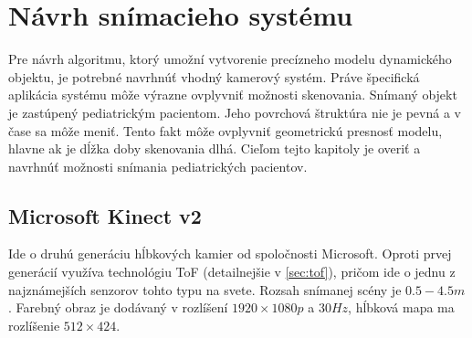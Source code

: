 
\chapter{Návrh snímacieho systému} 
\label{kap:návrh systému}
\pagestyle{fancy}
\fancyhf{}
\fancyfoot[CE,CO]{\thepage}
\renewcommand{\footrulewidth}{1pt}

Pre návrh algoritmu, ktorý umožní vytvorenie precízneho modelu dynamického objektu, je potrebné navrhnúť vhodný kamerový systém. Práve špecifická aplikácia systému môže výrazne ovplyvniť možnosti skenovania. Snímaný objekt je zastúpený pediatrickým pacientom. Jeho povrchová štruktúra nie je pevná a v čase sa môže meniť. Tento fakt môže ovplyvniť geometrickú presnosť modelu, hlavne ak je dĺžka doby skenovania dlhá. Cieľom tejto kapitoly je overiť a navrhnúť možnosti snímania pediatrických pacientov.


%
%
%

\section{Microsoft Kinect v2}

Ide o druhú generáciu hĺbkových kamier od spoločnosti Microsoft. Oproti prvej generácií využíva technológiu ToF (detailnejšie v \ref{sec:tof}), pričom ide o jednu z najznámejších senzorov tohto typu na svete. Rozsah snímanej scény je $0.5-4.5 m$. Farebný obraz je dodávaný v rozlíšení $1920\times1080p$ a $30Hz$, hĺbková mapa ma rozlíšenie $512\times424$.

